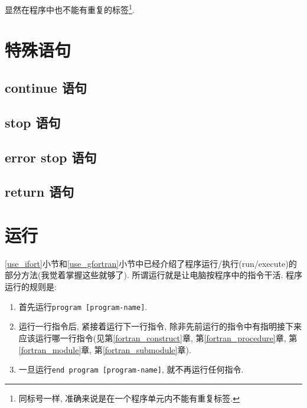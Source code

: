 显然在程序中也不能有重复的标签\footnote{
    同标号一样, 准确来说是在一个程序单元内不能有重复标签.
}.

\section{特殊语句}

\subsection{continue 语句}

\subsection{stop 语句}

\subsection{error stop 语句}

\subsection{return 语句}

\section{运行}\label{run_fortran}

\ref{use_ifort}小节和\ref{use_gfortran}小节中已经介绍了程序运行/执行(run/execute)的部分方法(我觉着掌握这些就够了). 所谓运行就是让电脑按程序中的指令干活. 程序运行的规则是:
\begin{enumerate}
    \item 首先运行\texttt{program [program-name]}.
    \item 运行一行指令后, 紧接着运行下一行指令, 除非先前运行的指令中有指明接下来应该运行哪一行指令(见第\ref{fortran_construct}章, 第\ref{fortran_procedure}章, 第\ref{fortran_module}章, 第\ref{fortran_submodule}章).
    \item 一旦运行\texttt{end program [program-name]}, 就不再运行任何指令.
\end{enumerate}

